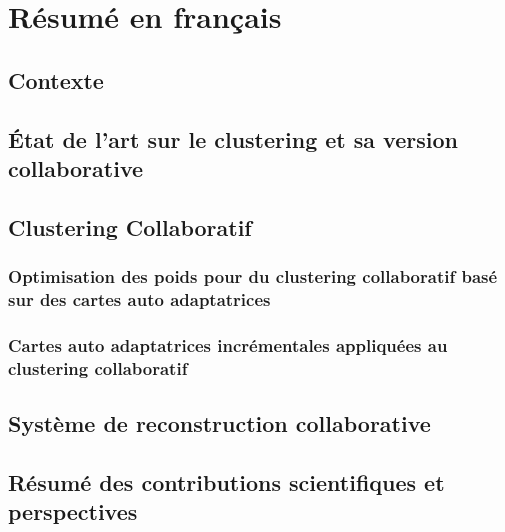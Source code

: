 \chapter{Résumé en français}

\section{Contexte}

\section{État de l'art sur le clustering et sa version collaborative}

\section{Clustering Collaboratif}

\subsection{Optimisation des poids pour du clustering collaboratif basé sur des cartes auto adaptatrices}

\subsection{Cartes auto adaptatrices incrémentales appliquées au clustering collaboratif}

\section{Système de reconstruction collaborative}

\section{Résumé des contributions scientifiques et perspectives}
